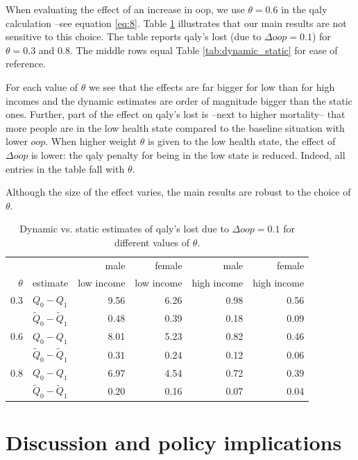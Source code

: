 \documentclass[a4paper,12pt]{article}
\begin{document}
When evaluating the effect of an increase in oop, we use \(\theta=0.6\) in the qaly calculation --see equation \eqref{eq:8}. Table \ref{tab:dynamic_static_theta} illustrates that our main results are not sensitive to this choice. The table reports qaly's lost (due to \(\Delta oop =0.1\)) for \(\theta=0.3\) and \(0.8\). The middle rows equal Table \ref{tab:dynamic_static} for ease of reference.

For each value of \(\theta\) we see that the effects are far bigger for low than for high incomes and the dynamic estimates are order of magnitude bigger than the static ones. Further, part of the effect on qaly's lost is --next to higher mortality-- that more people are in the low health state compared to the baseline situation with lower \(oop\). When higher weight \(\theta\) is given to the low health state, the effect of \(\Delta oop\) is lower: the qaly penalty for being in the low state is reduced. Indeed, all entries in the table fall with \(\theta\).

Although the size of the effect varies, the main results are robust to the choice of \(\theta\).

\begin{table}[htbp]
\caption{\label{tab:dynamic_static_theta}Dynamic vs. static estimates of qaly's lost due to \(\Delta oop = 0.1\) for different values of \(\theta\).}
\centering
\begin{tabular}{rlrrrr}
 &  & male & female & male & female\\
\(\theta\) & estimate & low income & low income & high income & high income\\
\hline
0.3 & \(Q_0 - Q_1\) & 9.56 & 6.26 & 0.98 & 0.56\\
 & \(\tilde Q_0 - \tilde Q_1\) & 0.48 & 0.39 & 0.18 & 0.09\\
0.6 & \(Q_0 - Q_1\) & 8.01 & 5.23 & 0.82 & 0.46\\
 & \(\tilde Q_0 - \tilde Q_1\) & 0.31 & 0.24 & 0.12 & 0.06\\
0.8 & \(Q_0 - Q_1\) & 6.97 & 4.54 & 0.72 & 0.39\\
 & \(\tilde Q_0 - \tilde Q_1\) & 0.20 & 0.16 & 0.07 & 0.04\\
\end{tabular}
\end{table}
\section{Discussion and policy implications}
\label{sec:org58cab9b}
\end{document}
